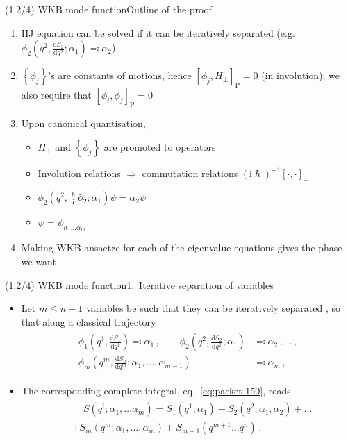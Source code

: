 \documentclass[mathserif]{beamer}
\newcommand{\rbr}[1]{{\left(#1\right)}}
\newcommand{\sbr}[1]{{\left[#1\right]}}
\newcommand{\cbr}[1]{{\left\{#1\right\}}}
\newcommand{\rfun}[2]{#1\mathopen{}\left(#2\right)\mathclose{}}
\newcommand{\dif}{\mathrm{d}}
\newcommand\mi{\mathrm{i}} %
\begin{document}
\begin{frame}{(1.2/4) WKB mode function}{Outline of the proof}
\begin{enumerate}
    \item HJ equation can be solved if it can be iteratively separated (e.g.\ $\rfun{\phi_2}{q^2, \tfrac{\dif S_2}{\dif q^2}; \alpha_1} \eqqcolon \alpha_2$)
    \item $\cbr{\phi_j}$'s are constants of motions, hence $\sbr{\phi_j, H_\perp}_{\text{P}} = 0$ (in involution); we also require that $\sbr{\phi_i, \phi_j}_\text{P} = 0$
    \item Upon canonical quantisation,
    \begin{itemize}
        \item $H_\perp$ and $\cbr{\phi_j}$ are promoted to operators
        \item Involution relations $\Rightarrow$ commutation relations $\rbr{\mi\hslash}^{-1}\sbr{\cdot,\cdot}_{-}$
        \item $\rfun{\phi_2}{q^2, \tfrac{\hslash}{\mi}\partial_2; \alpha_1} \psi = \alpha_2 \psi$
        \item $\psi = \psi_{\alpha_1 \ldots \alpha_m}$
    \end{itemize}
    \item Making WKB ansaetze for each of the eigenvalue equations gives the phase we want
\end{enumerate}
\end{frame}

\begin{frame}{(1.2/4) WKB mode function}{1.\ Iterative separation of variables}
\begin{itemize}
    \item Let $m \le n-1$ variables be such that they can be iteratively separated , so that along a classical trajectory
\begin{align}
\begin{split}
    \rfun{\phi_1}{q^1, \tfrac{\dif S_1}{\dif q^1}} \eqqcolon \alpha_1\,,
    \qquad
    \rfun{\phi_2}{q^2, \tfrac{\dif S_2}{\dif q^2}; \alpha_1} &\eqqcolon \alpha_2\,,
    \ldots\,,\\
    \rfun{\phi_m}{q^m, \tfrac{\dif S_n}{\dif q^m}; \alpha_1,\ldots, \alpha_{m-1}} &\eqqcolon \alpha_m\,,
\end{split}
\label{eq:packet-200}
\end{align}
\item The corresponding complete integral, eq.\ \eqref{eq:packet-150}, reads
\begin{align}
\begin{split}
    &\quad\,\rfun{S}{q^i; \alpha_1, \ldots \alpha_m} = \rfun{S_1}{q^1; \alpha_1} + \rfun{S_2}{q^2; \alpha_1, \alpha_2} +
    \ldots
    \\
    &+ \rfun{S_m}{q^m; \alpha_1, \ldots, \alpha_m}
    +
    \rfun{S_{m+1}}{q^{m+1}\ldots q^n}\,. %
    \label{eq:packet-250}
\end{split}
\end{align}
\end{itemize}
\end{frame}
\end{document}
